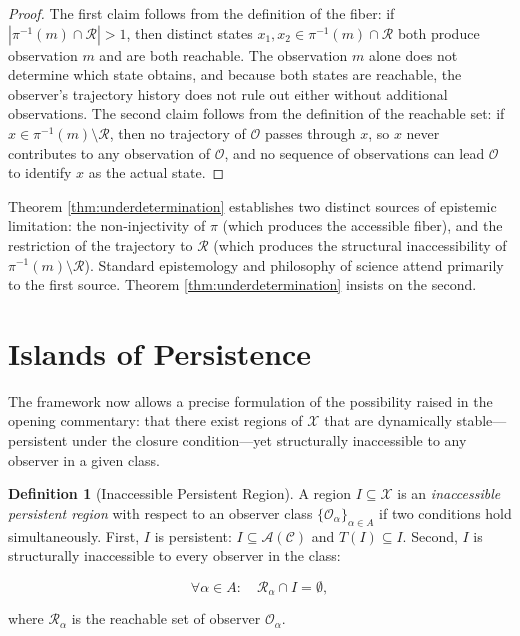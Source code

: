 \documentclass[12pt, a4paper, oneside]{article}
\theoremstyle{plain}
\theoremstyle{definition}
\newtheorem{definition}[theorem]{Definition}
\theoremstyle{remark}
\newcommand{\X}{\mathcal{X}}
\newcommand{\C}{\mathcal{C}}
\newcommand{\Obs}{\mathcal{O}}
\newcommand{\R}{\mathcal{R}}
\newcommand{\A}{\mathcal{A}}
\newcommand{\T}{T}
\newcommand{\proj}{\pi}
\begin{document}
\begin{proof}
The first claim follows from the definition of the fiber: if $|\proj^{-1}(m) \cap \R| > 1$, then distinct states $x_1, x_2 \in \proj^{-1}(m) \cap \R$ both produce observation $m$ and are both reachable. The observation $m$ alone does not determine which state obtains, and because both states are reachable, the observer's trajectory history does not rule out either without additional observations. The second claim follows from the definition of the reachable set: if $x \in \proj^{-1}(m) \setminus \R$, then no trajectory of $\Obs$ passes through $x$, so $x$ never contributes to any observation of $\Obs$, and no sequence of observations can lead $\Obs$ to identify $x$ as the actual state.
\end{proof}

Theorem \ref{thm:underdetermination} establishes two distinct sources of epistemic limitation: the non-injectivity of $\proj$ (which produces the accessible fiber), and the restriction of the trajectory to $\R$ (which produces the structural inaccessibility of $\proj^{-1}(m) \setminus \R$). Standard epistemology and philosophy of science attend primarily to the first source. Theorem \ref{thm:underdetermination} insists on the second.

\section{Islands of Persistence}

The framework now allows a precise formulation of the possibility raised in the opening commentary: that there exist regions of $\X$ that are dynamically stable---persistent under the closure condition---yet structurally inaccessible to any observer in a given class.

\begin{definition}[Inaccessible Persistent Region]
A region $I \subseteq \X$ is an \emph{inaccessible persistent region} with respect to an observer class $\{\Obs_\alpha\}_{\alpha \in A}$ if two conditions hold simultaneously. First, $I$ is persistent: $I \subseteq \A(\C)$ and $\T(I) \subseteq I$. Second, $I$ is structurally inaccessible to every observer in the class:

\begin{equation}
\forall \alpha \in A : \quad \R_\alpha \cap I = \emptyset,
\end{equation}

where $\R_\alpha$ is the reachable set of observer $\Obs_\alpha$.
\end{definition}
\end{document}
